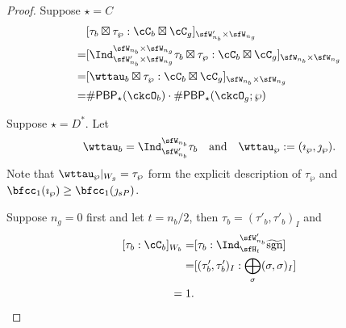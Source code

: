 \documentclass[12pt,a4paper]{amsart}
\newcommand{\Res}{\mathrm{Res}}
\newcommand{\sgn}{\operatorname{sgn}}
\numberwithin{equation}{section}
\theoremstyle{remark}
\def\Irr{\mathrm{Irr}}
\def\AND{\quad \text{and} \quad}
\def\hsgn{\widetilde{\mathrm{sgn}}}
\def\tsgn{\widetilde{\sgn}}
\def\PBP{\mathsf{PBP}}
\begin{document}
\begin{proof}
  Suppose $\star=C$
  \[
\begin{split}
  & [\tau_{b}\boxtimes \tau_{\wp} :
  \cC_{b} \boxtimes \cC_{g}]_{\sfW'_{n_{b}}\times \sfW_{n_{g}}}\\
  = & [\Ind_{\sfW'_{n_{b}}\times \sfW_{n_{g}}}^{\sfW_{n_{b}}\times \sfW_{n_{g}}} \tau_{b}\boxtimes \tau_{\wp} :
  \cC_{b} \boxtimes \cC_{g}]_{\sfW_{n_{b}}\times \sfW_{n_{g}}}\\
  = & [\wttau_{b}\boxtimes \tau_{\wp}:
  \cC_{b} \boxtimes \cC_{g}]_{\sfW_{n_{b}}\times \sfW_{n_{g}}}\\
  =& \# \PBP_{\star}(\ckcO_{b})\cdot \# \PBP_{\star}(\ckcO_{g};\wp)
\end{split}
  \]



  Suppose $\star = D^{*}$.
  Let
  \[
  \wttau_{b} = \Ind_{\sfW'_{n_{b}}}^{\sfW_{n_{b}}} \tau_{b} \AND
  \wttau_{\wp}: = (\imath_{\wp},\jmath_{\wp}).
  \]
  Note that $\wttau_{\wp}|_{W_{g}} = \tau_{\wp}$ form the explicit description
  of $\tau_{\wp}$ and $\bfcc_{1}(\imath_{\wp})\geq \bfcc_{1}(\jmath_{sP})$.


  Suppose $n_{g}=0$ first and let $t=n_{b}/2$, then
  $\tau_{b} = (\tau'_{b},\tau'_{b})_{I}$ and
  \[
    \begin{split}
        [\tau_{b} :
      \cC_{b}]_{W_{b}}
      = &
      [\tau_{b}: \Ind_{\sfH_{t}}^{\sfW'_{n_{b}}}\tsgn]\\
      = & [(\tau'_{b},\tau'_{b})_{I}: \bigoplus_{\sigma}(\sigma,\sigma)_{I}]\\
      = 1.
    \end{split}
  \]



\end{proof}
\end{document}
